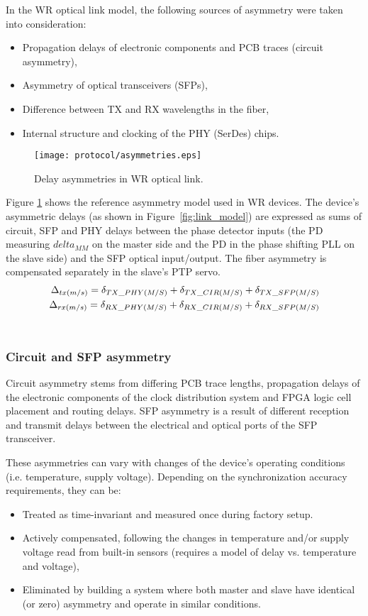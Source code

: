 In the WR optical link model, the following sources of asymmetry were taken
into consideration:
\begin {itemize}
\item Propagation delays of electronic components and PCB traces (circuit
asymmetry),
\item Asymmetry of optical transceivers (SFPs),
\item Difference between TX and RX wavelengths in the fiber,
\item Internal structure and clocking of the PHY (SerDes) chips.
\end{itemize}
\begin{figure}[ht!]
  \centering
  \texttt{[image: protocol/asymmetries.eps]}
  \caption{Delay asymmetries in WR optical link.}
  \label{fig:asymmetries}
\end{figure}
Figure \ref{fig:asymmetries} shows the reference asymmetry model used in WR
devices. The device's asymmetric delays (as shown in Figure~\ref{fig:link_model})
are expressed as sums of circuit, SFP and PHY delays between the phase detector
inputs (the PD measuring $delta_{MM}$ on the master side and the PD in the
phase shifting PLL on the slave side) and the SFP optical input/output. The
fiber asymmetry is compensated separately in the slave's PTP servo.
\begin{eqnarray}
\Delta_{tx(m/s)} = \delta_{TX\us PHY(M/S)} + \delta_{TX\us CIR(M/S)} +
\delta_{TX\us SFP(M/S)}
\\
\Delta_{rx(m/s)} = \delta_{RX\us PHY(M/S)} + \delta_{RX\us CIR(M/S)} +
\delta_{RX\us SFP(M/S)} \nonumber
\label{eq:asym_delay}
\end{eqnarray}\\

\subsubsection{Circuit and SFP asymmetry}
Circuit asymmetry stems from differing PCB trace lengths, propagation delays
of the electronic components of the clock distribution system and FPGA logic
cell placement and routing delays. SFP asymmetry is a result of different
reception and transmit delays between the electrical and optical ports of
the SFP transceiver.

These asymmetries can vary with changes of the device's operating conditions
(i.e. temperature, supply voltage). Depending on the synchronization accuracy
requirements, they can be:
\begin{itemize}
\item Treated as time-invariant and measured once during factory setup.
\item Actively compensated, following the changes in temperature and/or supply
voltage read from built-in sensors (requires a model of delay vs. temperature
and voltage),
\item Eliminated by building a system where both master and slave have
identical (or zero) asymmetry and operate in similar conditions.
\end{itemize}


